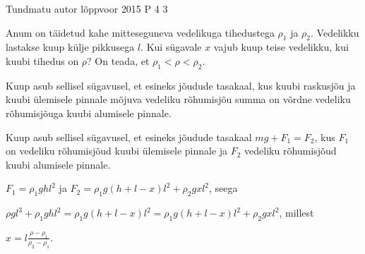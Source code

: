 {Tundmatu autor} %
{lõppvoor} %
{2015} %
{P 4} %
{3} %
{

\ifStatement
Anum on täidetud kahe mitteseguneva vedelikuga tihedustega $\rho_1$ ja $\rho_2$. Vedelikku lastakse kuup külje pikkusega $l$. Kui sügavale $x$ vajub kuup teise vedelikku, kui kuubi tihedus on $\rho$? On teada, et $\rho_1 < \rho < \rho_2$.
\fi

\ifHint
Kuup asub sellisel sügavusel, et esineks jõudude tasakaal, kus kuubi raskusjõu ja kuubi ülemisele pinnale mõjuva vedeliku rõhumisjõu summa on võrdne vedeliku rõhumisjõuga kuubi alumisele pinnale.
\fi

\ifSolution
Kuup asub sellisel sügavusel, et esineks jõudude tasakaal $mg + F_1 = F_2$, kus $F_1$ on vedeliku rõhumisjõud kuubi ülemisele pinnale ja $F_2$ vedeliku rõhumisjõud kuubi alumisele pinnale.
\begin{center}
$F_1 = \rho_1 g h l^2$ ja $F_2 = \rho_1 g (h + l - x) l^2 + \rho_2 g x l^2$, seega
\end{center}
\begin{center}
$\rho g l^3 + \rho_1 gh l^2 = \rho_1 g(h + l - x)l^2 = \rho_1 g (h +l -x)l^2 + \rho_2 g x l^2$, millest 
\end{center}
\begin{center}
$x = l\frac{\rho - \rho_1}{\rho_2 - \rho_1}$.
\end{center}
 \fi
}